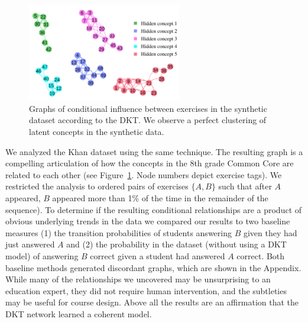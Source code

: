 \begin{figure}[!h]
\centering
\includegraphics[width=0.6\textwidth]{img/conceptClusters_synth}
\caption[Conditional influences synthetic data]{Graphs of conditional influence between exercises in the synthetic dataset according to the DKT. We observe a perfect clustering of latent concepts in the synthetic data. 
\label{fig:conceptClusters}
}
\end{figure}

We analyzed the Khan dataset using the same technique. The resulting graph is a compelling articulation of how the concepts in the 8th grade Common Core are related to each other (see Figure~\ref{fig:conceptClusters}. Node numbers depict exercise tags).
We restricted the analysis to ordered pairs of exercises $\{A,B\}$ such that after $A$ appeared, $B$ appeared more than 1\% of the time in the remainder of the sequence).
To determine if the resulting conditional relationships are a product of obvious underlying trends in the data we compared our results to two baseline measures (1) the transition probabilities of students answering $B$ given they had just answered $A$ and (2) the probability in the dataset (without using a DKT model) of answering $B$ correct given a student had answered $A$ correct.
Both baseline methods generated discordant graphs, which are shown in the Appendix. While many of the relationships we uncovered may be unsurprising to an education expert, they did not require human intervention, and the subtleties may be useful for course design. Above all the results are an affirmation that the DKT network learned a coherent model.


